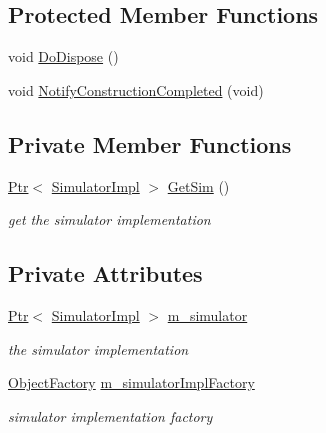 \subsection*{Protected Member Functions}
\begin{DoxyCompactItemize}
\item 
void \hyperlink{classns3_1_1VisualSimulatorImpl_a28bd9a5200f0dc1e24554292f391e8ea}{Do\+Dispose} ()
\item 
void \hyperlink{classns3_1_1VisualSimulatorImpl_a7e788ff64a168a14f94f20161d4c3603}{Notify\+Construction\+Completed} (void)
\end{DoxyCompactItemize}
\subsection*{Private Member Functions}
\begin{DoxyCompactItemize}
\item 
\hyperlink{classns3_1_1Ptr}{Ptr}$<$ \hyperlink{classns3_1_1SimulatorImpl}{Simulator\+Impl} $>$ \hyperlink{classns3_1_1VisualSimulatorImpl_a27ba830c93ed9645ffacc1dcce338734}{Get\+Sim} ()
\begin{DoxyCompactList}\small\item\em get the simulator implementation \end{DoxyCompactList}\end{DoxyCompactItemize}
\subsection*{Private Attributes}
\begin{DoxyCompactItemize}
\item 
\hyperlink{classns3_1_1Ptr}{Ptr}$<$ \hyperlink{classns3_1_1SimulatorImpl}{Simulator\+Impl} $>$ \hyperlink{classns3_1_1VisualSimulatorImpl_a7b9ed59ce7157aa47497a586be580a24}{m\+\_\+simulator}
\begin{DoxyCompactList}\small\item\em the simulator implementation \end{DoxyCompactList}\item 
\hyperlink{classns3_1_1ObjectFactory}{Object\+Factory} \hyperlink{classns3_1_1VisualSimulatorImpl_a70ced83e592d6aac7ff41638d0d7b3e3}{m\+\_\+simulator\+Impl\+Factory}
\begin{DoxyCompactList}\small\item\em simulator implementation factory \end{DoxyCompactList}\end{DoxyCompactItemize}
